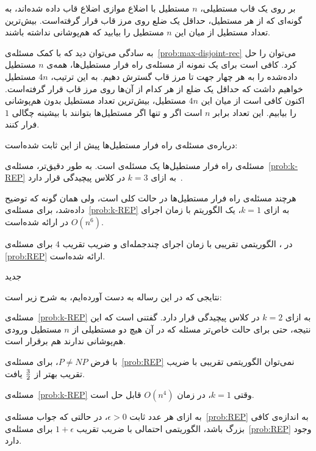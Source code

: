 \label{prob:max-disjoint-rec}

بر روی یک قاب مستطیلی، $n$ مستطیل با اضلاع موازی اضلاع قاب داده شده‌اند، به گونه‌ای که از هر مستطیل، حد‌اقل یک ضلع روی مرز قاب قرار گرفته‌است. بیش‌ترین تعداد مستطیل از میان این $n$ مستطیل را بیابید که هم‌پوشانی نداشته باشند.


به سادگی می‌توان دید که با کمک مسئله‌ی~\ref{prob:max-disjoint-rec} می‌توان  را حل کرد. کافی است برای یک نمونه از مسئله‌ی راه فرار مستطیل‌ها، همه‌ی $n$ مستطیل داده‌شده را به هر چهار جهت تا مرز قاب گسترش دهیم. به این ترتیب، $4n$ مستطیل خواهیم داشت که حد‌اقل یک ضلع از هر کدام از آن‌ها روی مرز قاب قرار گرفته‌است. اکنون کافی است از میان این $4n$ مستطیل، بیش‌ترین تعداد مستطیل بدون هم‌پوشانی را بیابیم. این تعداد برابر $n$ است اگر و تنها اگر مستطیل‌ها بتوانند با بیشینه چگالی $1$ فرار کنند.


درباره‌ی مسئله‌ی راه فرار مستطیل‌ها پیش از این ثابت شده‌است:


 مسئله‌ی راه فرار مستطیل‌ها یک مسئله‌ی  است. به طور دقیق‌تر، مسئله‌ی~\ref{prob:k-REP} به ازای $k = 3$ در کلاس پیچیدگی  قرار دارد~\cite{REP}.

 هر‌چند مسئله‌ی راه فرار مستطیل‌ها در حالت کلی  است، ولی همان گونه که توضیح داده‌شد، برای مسئله‌ی~\ref{prob:k-REP} به ازای $k = 1$، یک الگوریتم با زمان اجرای $O(n ^ 6)$ در \cite{BoundaryRec} ارائه شده‌است.

 در \cite{REP}، الگوریتمی تقریبی با زمان اجرای چند‌جمله‌ای و ضریب تقریب $4$ برای مسئله‌ی \ref{prob:REP} ارائه شده‌است.


‌جدید


نتایجی که در این رساله به دست آورده‌ایم، به شرح زیر است:


 مسئله‌ی~\ref{prob:k-REP} به ازای $k = 2$ در کلاس پیچیدگی  قرار دارد. گفتنی است که این نتیجه، حتی برای حالت خاص‌تر مسئله که در آن هیچ دو مستطیلی از $n$ مستطیل ورودی هم‌پوشانی ندارند هم برقرار است.

 با فرض $P \neq NP$، برای مسئله‌ی~\ref{prob:REP} نمی‌توان الگوریتمی تقریبی با ضریب تقریب بهتر از ${3} \over {2}$ یافت.

 مسئله‌ی~\ref{prob:k-REP} وقتی $k = 1$، در زمان $O(n ^ 4)$ قابل حل است.

 به ازای هر عدد ثابت $\epsilon > 0$، در حالتی که جواب مسئله‌ی~\ref{prob:REP} به اندازه‌ی کافی بزرگ باشد، الگوریتمی احتمالی با ضریب تقریب $1 + \epsilon$ برای مسئله‌ی~\ref{prob:REP} وجود دارد.

